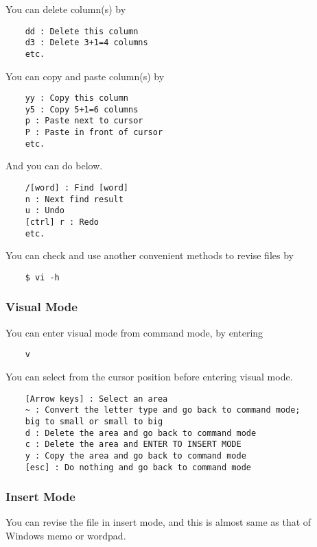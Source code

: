 You can delete column(s) by

\begin{verbatim}
    dd : Delete this column
    d3 : Delete 3+1=4 columns
    etc.
\end{verbatim}

You can copy and paste column(s) by

\begin{verbatim}
    yy : Copy this column
    y5 : Copy 5+1=6 columns
    p : Paste next to cursor
    P : Paste in front of cursor
    etc.
\end{verbatim}

And you can do below.

\begin{verbatim}
    /[word] : Find [word]
    n : Next find result
    u : Undo
    [ctrl] r : Redo
    etc.
\end{verbatim}

You can check and use another convenient methods to revise files by

\begin{verbatim}
    $ vi -h
\end{verbatim}

\subsubsection{Visual Mode}

You can enter visual mode from command mode, by entering

\begin{verbatim}
    v
\end{verbatim}

You can select from the cursor position before entering visual mode.

\begin{verbatim}
    [Arrow keys] : Select an area
    ~ : Convert the letter type and go back to command mode;
    big to small or small to big
    d : Delete the area and go back to command mode
    c : Delete the area and ENTER TO INSERT MODE
    y : Copy the area and go back to command mode
    [esc] : Do nothing and go back to command mode
\end{verbatim}

\subsubsection{Insert Mode}

You can revise the file in insert mode, and this is almost same as that of Windows memo or wordpad.

